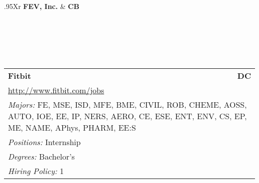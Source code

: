 \documentclass[twoside]{article}
\begin{document}
\begin{center}
\begin{multicols}{3}
\begin{FlushLeft}
\begin{minipage}{.9\columnwidth}
\end{minipage}
 
\begin{minipage}{.9\columnwidth}\begin{tabularx}{.95\columnwidth}{Xr}
                 {\Large\bf FEV, Inc.} & {\Large\bf CB}\\
    \\
    \\
    \\
    \\
    \\
    \end{tabularx}
    
\end{minipage}
 
\begin{minipage}{.9\columnwidth}\begin{tabularx}{.95\columnwidth}{Xr}
                 {\Large\bf Fitbit} & {\Large\bf DC}\\
    \multicolumn{2}{p{.95\columnwidth}}{\url{http://www.fitbit.com/jobs}}\\
    \multicolumn{2}{p{.95\columnwidth}}{\emph{Majors:} FE, MSE, ISD, MFE, BME, CIVIL, ROB, CHEME, AOSS, AUTO, IOE, EE, IP, NERS, AERO, CE, ESE, ENT, ENV, CS, EP, ME, NAME, APhys, PHARM, EE:S}\\
    \multicolumn{2}{p{.95\columnwidth}}{\emph{Positions:} Internship}\\
    \multicolumn{2}{p{.95\columnwidth}}{\emph{Degrees:} Bachelor's}\\
    \multicolumn{2}{p{.95\columnwidth}}{\emph{Hiring Policy:} 1}\\
    \end{tabularx}
    
\end{minipage}
 

\end{FlushLeft}
\end{multicols}
\end{center}
\end{document}
